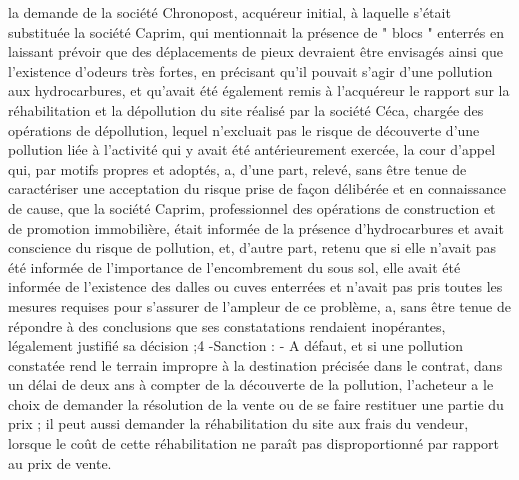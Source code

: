 \documentclass[11pt,a4paper]{report}
\begin{document}
	la demande de la société Chronopost, acquéreur initial, à laquelle s'était substituée la société Caprim, qui
	mentionnait la présence de " blocs " enterrés en laissant prévoir que des déplacements de pieux devraient être
	envisagés ainsi que l'existence d'odeurs très fortes, en précisant qu'il pouvait s'agir d'une pollution aux
	hydrocarbures, et qu'avait été également remis à l'acquéreur le rapport sur la réhabilitation et la dépollution du
	site réalisé par la société Céca, chargée des opérations de dépollution, lequel n'excluait pas le risque de
	découverte d'une pollution liée à l'activité qui y avait été antérieurement exercée, la cour d'appel qui, par motifs
	propres et adoptés, a, d'une part, relevé, sans être tenue de caractériser une acceptation du risque prise de façon
	délibérée et en connaissance de cause, que la société Caprim, professionnel des opérations de construction et de
	promotion immobilière, était informée de la présence d'hydrocarbures et avait conscience du risque de
	pollution, et, d'autre part, retenu que si elle n'avait pas été informée de l'importance de l'encombrement du sous
	sol, elle avait été informée de l'existence des dalles ou cuves enterrées et n'avait pas pris toutes les mesures
	requises pour s'assurer de l'ampleur de ce problème, a, sans être tenue de répondre à des conclusions que ses
	constatations rendaient inopérantes, légalement justifié sa décision ;4
	-Sanction : - A défaut, et si une pollution constatée rend le terrain impropre à la destination précisée dans le
	contrat, dans un délai de deux ans à compter de la découverte de la pollution, l'acheteur a le choix de demander
	la résolution de la vente ou de se faire restituer une partie du prix ; il peut aussi demander la réhabilitation du
	site aux frais du vendeur, lorsque le coût de cette réhabilitation ne paraît pas disproportionné par rapport au
	prix de vente.
\end{document}
